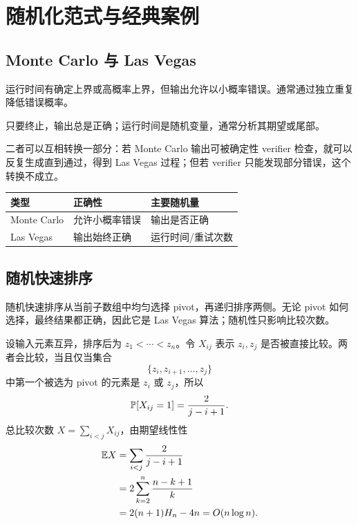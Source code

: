 \chapter{随机化范式与经典案例}

\section{Monte Carlo 与 Las Vegas}

\begin{definition}
运行时间有确定上界或高概率上界，但输出允许以小概率错误。通常通过独立重复降低错误概率。
\end{definition}

\begin{definition}
只要终止，输出总是正确；运行时间是随机变量，通常分析其期望或尾部。
\end{definition}

二者可以互相转换一部分：若 Monte Carlo 输出可被确定性 verifier 检查，就可以反复生成直到通过，得到 Las Vegas 过程；但若 verifier 只能发现部分错误，这个转换不成立。

\begin{center}
\begin{tabularx}{\textwidth}{lXX}
\toprule
类型 & 正确性 & 主要随机量\\
\midrule
Monte Carlo & 允许小概率错误 & 输出是否正确\\
Las Vegas & 输出始终正确 & 运行时间/重试次数\\
\bottomrule
\end{tabularx}
\end{center}

\section{随机快速排序}

随机快速排序从当前子数组中均匀选择 pivot，再递归排序两侧。无论 pivot 如何选择，最终结果都正确，因此它是 Las Vegas 算法；随机性只影响比较次数。

设输入元素互异，排序后为 $z_1<\cdots<z_n$。令 $X_{ij}$ 表示 $z_i,z_j$ 是否被直接比较。两者会比较，当且仅当集合
\[
\{z_i,z_{i+1},\dots,z_j\}
\]
中第一个被选为 pivot 的元素是 $z_i$ 或 $z_j$，所以
\[
\mathbb{P}[X_{ij}=1]=\frac{2}{j-i+1}.
\]
总比较次数 $X=\sum_{i<j}X_{ij}$，由期望线性性
\begin{align*}
\mathbb{E} X
&=\sum_{i<j}\frac{2}{j-i+1}\\
&=2\sum_{k=2}^n\frac{n-k+1}{k}\\
&=2(n+1)H_n-4n
=O(n\log n).
\end{align*}


